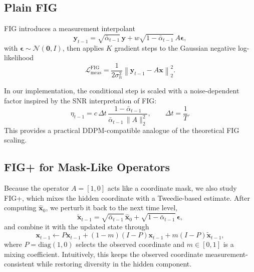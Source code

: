 \documentclass[10pt,twocolumn]{article}
\begin{document}
\subsection{Plain FIG}

FIG introduces a measurement interpolant
\begin{equation}
\mathbf{y}_{t-1}
=
\sqrt{\bar{\alpha}_{t-1}}\,\mathbf{y}
+
w\sqrt{1-\bar{\alpha}_{t-1}}\,A\boldsymbol{\epsilon},
\end{equation}
with \(\boldsymbol{\epsilon}\sim\mathcal{N}(\mathbf{0}, I)\), then applies \(K\) gradient steps to the Gaussian negative log-likelihood
\begin{equation}
\mathcal{L}_{\mathrm{meas}}^{\mathrm{FIG}}
=
\frac{1}{2\sigma_n^2}
\left\|
\mathbf{y}_{t-1} - A\mathbf{x}
\right\|_2^2.
\end{equation}

In our implementation, the conditional step is scaled with a noise-dependent factor inspired by the SNR interpretation of FIG:
\begin{equation}
\eta_{t-1}
=
c\,\Delta t\,
\frac{1-\bar{\alpha}_{t-1}}{\bar{\alpha}_{t-1}\,\|A\|_2^2},
\qquad
\Delta t = \frac{1}{T}.
\end{equation}
This provides a practical DDPM-compatible analogue of the theoretical FIG scaling.

\subsection{FIG+ for Mask-Like Operators}

Because the operator \(A=[1,0]\) acts like a coordinate mask, we also study FIG+, which mixes the hidden coordinate with a Tweedie-based estimate. After computing \(\hat{\mathbf{x}}_0\), we perturb it back to the next time level,
\begin{equation}
\tilde{\mathbf{x}}_{t-1}
=
\sqrt{\bar{\alpha}_{t-1}}\,\hat{\mathbf{x}}_0
+
\sqrt{1-\bar{\alpha}_{t-1}}\,\boldsymbol{\epsilon},
\end{equation}
and combine it with the updated state through
\begin{equation}
\mathbf{x}_{t-1}
\leftarrow
P\mathbf{x}_{t-1}
+
(1-m)(I-P)\mathbf{x}_{t-1}
+
m(I-P)\tilde{\mathbf{x}}_{t-1},
\end{equation}
where \(P=\mathrm{diag}(1,0)\) selects the observed coordinate and \(m\in[0,1]\) is a mixing coefficient. Intuitively, this keeps the observed coordinate measurement-consistent while restoring diversity in the hidden component.
\end{document}
